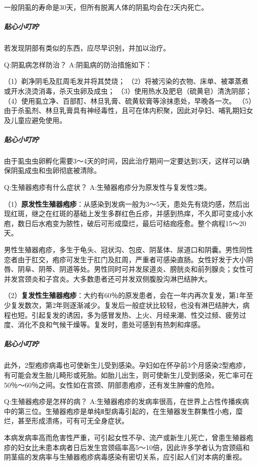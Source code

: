 \documentclass[12pt,UTF8]{ctexbook}
\begin{document}
一般阴虱的寿命是30天，但所有脱离人体的阴虱均会在2天内死亡。

\subparagraph{贴心小叮咛}

若发现阴部有类似的东西，应尽早识别，并加以治疗。

Q:阴虱病怎样防治？
A:阴虱病的防治措施如下：

（1）剃净阴毛及肛周毛发并将其焚烧；
（2）将被污染的衣物、床单、被罩蒸煮或开水浇烫消毒，杀灭虫卵及成虫；
（3）使用热水及肥皂（硫黄皂）清洗阴部；
（4）使用虱立净、百部酊、林旦乳膏、硫黄软膏等涂抹患处，早晚各一次。
（5）由于杀虱剂、林旦乳膏具有神经毒性，且可在体内积聚，因此对孕妇、哺乳期妇女及儿童应避免使用。

\subparagraph{贴心小叮咛}

由于虱虫虫卵孵化需要3～4天的时间，因此治疗期间一定要达到3天，这样可以确保阴虱成虫和虫卵彻底被清除。

Q:生殖器疱疹有什么症状？
A:生殖器疱疹分为原发性与复发性2类。

（1）\textbf{原发性生殖器疱疹}：从感染到发病一般为3～5天，患处先有烧灼感，然后出现红斑，继之在红斑的基础上发生多群红色丘疹，并感到热痒，不久即可变成小水庖，数日后水疱变为脓性，破后可形成糜烂，最后可结痂痊愈。整个病程15～20天。

男性生殖器疱疹，多生于龟头、冠状沟、包皮、阴茎体、尿道口和阴囊。男性同性恋者由于肛交，疱疹可发生于肛门及肛周，严重者可感染直肠。女性好发于大小阴唇、阴阜、阴蒂、阴道等处。男性同时可并发尿道炎、膀胱炎和前列腺炎；女性可并发宫颈炎和子宫炎。大多数患者还可并发双侧腹股沟淋巴结肿大。

（2）\textbf{复发性生殖器疱疹}：大约有60％的原发患者，会在一年内再次复发，第1年至少复发数次，第2年则逐渐减少。复发后一般症状比较轻，也没有淋巴结肿大，病程也短。引起复发的诱因，多为感冒发热、上火、月经来潮、性交过频、疲劳过度、消化不良和气候干燥等。复发时，患处可感到有热刺和痒感。

\subparagraph{贴心小叮咛}

此外，2型疱疹病毒也可使新生儿受到感染。孕妇如在怀孕前3个月感染2型疱疹，有可能会发生胎儿畸形或死胎。如胎儿出生，则可使新生儿受到感染，死亡率可在50％～60％之间。女性如在宫颈、阴部患疱疹，还有发生肿瘤的危险。

Q:生殖器疱疹是怎样的病？
A:生殖器疱疹的发病率很高，在世界上占性传播疾病中的第三位。生殖器疱疹是单纯Ⅱ型病毒引起的，在生殖器发生群集性小疱，糜烂，甚至形成溃疡，可有可无全身症状。

本病发病率高而危害性严重，可引起女性不孕、流产或新生儿死亡，曾患生殖器疱疹的妇女比未患本病者日后发生宫颈癌率高5～10倍，因此许多学者认为宫颈癌和阴茎癌的发病率与生殖器疱疹病毒感染有密切关系，应引起人们对本病的重视。
\end{document}
